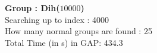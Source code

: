 \textbf{Group : Dih($10000$)}\\
Searching up to index : 4000\\
How many normal groups are found : 25\\
Total Time (in s) in GAP: 434.3\\
